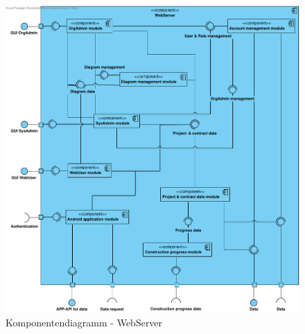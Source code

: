 \begin{figure}[H]
	\centering
	\includegraphics[width=16cm]{img/diagrams/Component-WebServer.pdf}	
	\caption{Komponentendiagramm - WebServer}
	\label{fig:komponentendiagramm-webserver}
\end{figure}

\clearpage


